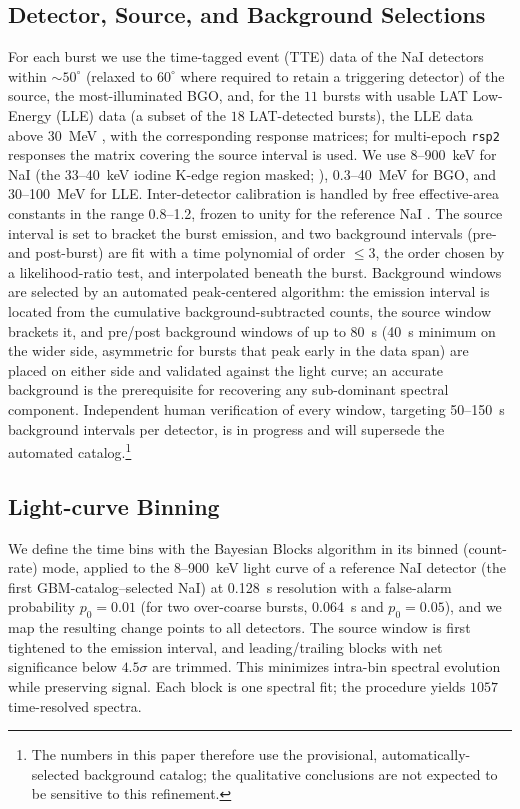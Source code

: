 \documentclass[twocolumn]{aastex631}
\begin{document}
\subsection{Detector, Source, and Background Selections} \label{sec:bkg}
For each burst we use the time-tagged event (TTE) data of the NaI detectors
within $\sim50^\circ$ (relaxed to $60^\circ$ where required to retain a
triggering detector) of the source, the most-illuminated BGO, and, for the
$11$ bursts with usable LAT Low-Energy (LLE) data (a subset of the $18$
LAT-detected bursts), the LLE data above 30~MeV \citep{Atwood2009}, with the
corresponding response matrices; for multi-epoch \texttt{rsp2} responses the
matrix covering the source interval is used. We use 8--900~keV for NaI (the
33--40~keV iodine K-edge region masked; \citealt{Ronchi2020}), 0.3--40~MeV for
BGO, and 30--100~MeV for LLE. Inter-detector calibration is handled by free
effective-area constants in the range 0.8--1.2, frozen to unity for the
reference NaI \citep[as in][]{Ronchi2020}. The source interval is set to bracket the burst emission,
and two background intervals (pre- and post-burst) are fit
with a time polynomial of order $\le$3, the order chosen by a likelihood-ratio
test, and interpolated beneath the burst. Background windows are selected by an
automated peak-centered algorithm: the emission interval is located from the
cumulative background-subtracted counts, the source window brackets it, and
pre/post background windows of up to 80~s (40~s minimum on the wider side,
asymmetric for bursts that peak early in the data span) are placed on either
side and validated against the light curve; an accurate background is the
prerequisite for recovering any sub-dominant spectral component. Independent
human verification of every window, targeting 50--150~s background intervals
per detector, is in progress and will supersede the automated
catalog.\footnote{The numbers in this paper therefore use the provisional,
automatically-selected background catalog; the qualitative conclusions are not
expected to be sensitive to this refinement.}

\subsection{Light-curve Binning} \label{sec:bin}
We define the time bins with the Bayesian Blocks algorithm \citep{Scargle2013}
in its binned (count-rate) mode, applied to the 8--900~keV light curve of a
reference NaI detector (the first GBM-catalog--selected NaI) at 0.128~s
resolution with a false-alarm probability $p_0=0.01$ (for two over-coarse
bursts, 0.064~s and $p_0=0.05$), and we map the resulting change points to all
detectors. The source window is first tightened to the emission interval, and
leading/trailing blocks with net significance below $4.5\sigma$ are trimmed.
This minimizes intra-bin spectral evolution while preserving signal. Each block
is one spectral fit; the procedure yields \textbf{$1057$} time-resolved spectra.
\end{document}

